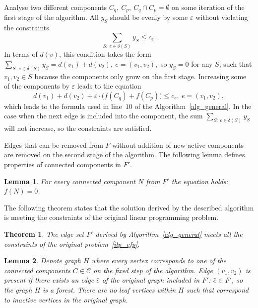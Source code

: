 \documentclass[12pt]{article}
\newtheorem{lemma}{Lemma}
\newtheorem{theorem}{Theorem}
\begin{document}
Analyse two different components $C_q,~C_p,~C_q\cap C_p=\emptyset$ on some iteration of the first stage of the algorithm. All $y_S$ should be evenly by some $\varepsilon$ without violating the constraints
 \[\sum\limits_ {S:~e\in \delta(S)}y_S\leqslant c_e. \]
In terms of $d(v)$, this condition takes the form~$\sum\limits_{S:~e\in \delta(S)}y_S = d(v_1)+d(v_2),~e=(v_1,v_2),$
so $y_S=0$ for any $S$, such that $v_1, v_2\in S$ because the components only grow on the first stage. Increasing some of the components by $\varepsilon$ leads to the  equation
 \[d(v_1)+d(v_2)+\varepsilon\cdot \bigl(f(C_q)+f(C_p)\bigr)\leqslant c_e,~e=(v_1,v_2), \]
which leads to the formula used in line~$10$ of the Algorithm~\ref{alg_general}. In the case when the next edge is included into the component, the sum $\sum\limits_{S:~e\in \delta (S)}y_S$ will not increase, so the constraints are satisfied.

Edges that can be removed from $F$ without addition of new active components are removed on the second stage of the algorithm. The following lemma defines properties of connected components in $F'$.

\begin{lemma}
  For every connected component $N$ from $F'$ the  equation holds: $f(N)=0$.
  \label{lem2}
\end{lemma}

The following theorem states that the solution derived by the described algorithm is meeting the constraints of the original linear programming problem.

\begin{theorem}
  The edge set $F'$ derived by Algorithm~\ref{alg_general} meets all the constraints of the original problem~\eqref{ilp_cfp}.
  \label{theorem1}
\end{theorem}

  \begin{lemma}
    Denote graph $H$ where every vertex corresponds to one of the connected components $C\in \mathcal{C}$ on the fixed step of the algorithm. Edge $(v_1,v_2)$ is present if there exists an edge $\hat{e}$ of the original graph included in $F'$: $\hat{e} \in F'$, so the graph $H$ is a forest. There are no leaf vertices within $H$ such that correspond to inactive vertices in the original graph.
  \label{lemma_small}
  \end{lemma}
\end{document}
